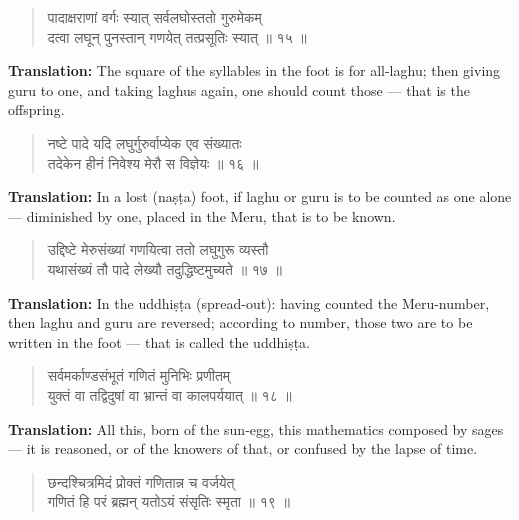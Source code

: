 \documentclass[11pt,a4paper]{article}
\newenvironment{shloka}{\begin{verse}\devanagarifont\large}{\end{verse}}
\begin{document}
\vspace{0.3cm}

\begin{shloka}
पादाक्षराणां वर्गः स्यात् सर्वलघोस्ततो गुरुमेकम् \\
दत्वा लघून् पुनस्तान् गणयेत् तत्प्रसूतिः स्यात् ॥ १५ ॥
\end{shloka}

\textbf{Translation:}\quad
The square of the syllables in the foot is for all-laghu; then giving
guru to one, and taking laghus again, one should count those — that
is the offspring.

\vspace{0.3cm}

\begin{shloka}
नष्टे पादे यदि लघुर्गुरुर्वाप्येक एव संख्यातः \\
तदेकेन हीनं निवेश्य मेरौ स विज्ञेयः ॥ १६ ॥
\end{shloka}

\textbf{Translation:}\quad
In a lost (naṣṭa) foot, if laghu or guru is to be counted as one
alone — diminished by one, placed in the Meru, that is to be known.

\vspace{0.3cm}

\begin{shloka}
उद्दिष्टे मेरुसंख्यां गणयित्वा ततो लघुगुरू व्यस्तौ \\
यथासंख्यं तौ पादे लेख्यौ तदुद्धिष्टमुच्यते ॥ १७ ॥
\end{shloka}

\textbf{Translation:}\quad
In the uddhiṣṭa (spread-out): having counted the Meru-number, then
laghu and guru are reversed; according to number, those two are to
be written in the foot — that is called the uddhiṣṭa.

\vspace{0.3cm}

\begin{shloka}
सर्वमर्काण्डसंभूतं गणितं मुनिभिः प्रणीतम् \\
युक्तं वा तद्विदुषां वा भ्रान्तं वा कालपर्ययात् ॥ १८ ॥
\end{shloka}

\textbf{Translation:}\quad
All this, born of the sun-egg, this mathematics composed by sages —
it is reasoned, or of the knowers of that, or confused by the lapse
of time.

\vspace{0.3cm}

\begin{shloka}
छन्दश्चित्रमिदं प्रोक्तं गणितान्न च वर्जयेत् \\
गणितं हि परं ब्रह्मन् यतोऽयं संसृतिः स्मृता ॥ १९ ॥
\end{shloka}
\end{document}
